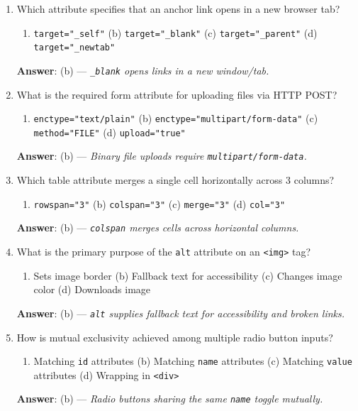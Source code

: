 \begin{enumerate}[leftmargin=1.5em]
    \item Which attribute specifies that an anchor link opens in a new browser tab?
    \begin{enumerate}[label=(\alph*)]
        \item \texttt{target="\_self"} \quad (b) \texttt{target="\_blank"} \quad (c) \texttt{target="\_parent"} \quad (d) \texttt{target="\_newtab"}
    \end{enumerate}
    \textbf{Answer}: (b) --- \textit{\texttt{\_blank} opens links in a new window/tab.}

    \item What is the required form attribute for uploading files via HTTP POST?
    \begin{enumerate}[label=(\alph*)]
        \item \texttt{enctype="text/plain"} \quad (b) \texttt{enctype="multipart/form-data"} \quad (c) \texttt{method="FILE"} \quad (d) \texttt{upload="true"}
    \end{enumerate}
    \textbf{Answer}: (b) --- \textit{Binary file uploads require \texttt{multipart/form-data}.}

    \item Which table attribute merges a single cell horizontally across 3 columns?
    \begin{enumerate}[label=(\alph*)]
        \item \texttt{rowspan="3"} \quad (b) \texttt{colspan="3"} \quad (c) \texttt{merge="3"} \quad (d) \texttt{col="3"}
    \end{enumerate}
    \textbf{Answer}: (b) --- \textit{\texttt{colspan} merges cells across horizontal columns.}

    \item What is the primary purpose of the \texttt{alt} attribute on an \texttt{<img>} tag?
    \begin{enumerate}[label=(\alph*)]
        \item Sets image border \quad (b) Fallback text for accessibility \quad (c) Changes image color \quad (d) Downloads image
    \end{enumerate}
    \textbf{Answer}: (b) --- \textit{\texttt{alt} supplies fallback text for accessibility and broken links.}

    \item How is mutual exclusivity achieved among multiple radio button inputs?
    \begin{enumerate}[label=(\alph*)]
        \item Matching \texttt{id} attributes \quad (b) Matching \texttt{name} attributes \quad (c) Matching \texttt{value} attributes \quad (d) Wrapping in \texttt{<div>}
    \end{enumerate}
    \textbf{Answer}: (b) --- \textit{Radio buttons sharing the same \texttt{name} toggle mutually.}


\end{enumerate}
